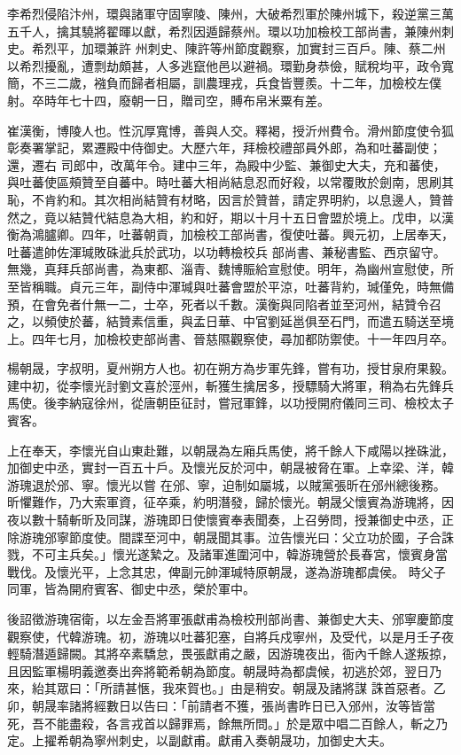 \begin{pinyinscope}
 李希烈侵陷汴州，環與諸軍守固寧陵、陳州，大破希烈軍於陳州城下，殺逆黨三萬五千人，擒其驍將翟暉以獻，希烈因遁歸蔡州。環以功加檢校工部尚書，兼陳州刺史。希烈平，加環兼許
 州刺史、陳許等州節度觀察，加實封三百戶。陳、蔡二州以希烈擾亂，遭剽劫頗甚，人多逃竄他邑以避禍。環勤身恭儉，賦稅均平，政令寬簡，不三二歲，襁負而歸者相屬，訓農理戎，兵食皆豐羨。十二年，加檢校左僕射。卒時年七十四，廢朝一日，贈司空，賻布帛米粟有差。



 崔漢衡，博陵人也。性沉厚寬博，善與人交。釋褐，授沂州費令。滑州節度使令狐彰奏署掌記，累遷殿中侍御史。大歷六年，拜檢校禮部員外郎，為和吐蕃副使；還，遷右
 司郎中，改萬年令。建中三年，為殿中少監、兼御史大夫，充和蕃使，與吐蕃使區頰贊至自蕃中。時吐蕃大相尚結息忍而好殺，以常覆敗於劍南，思刷其恥，不肯約和。其次相尚結贊有材略，因言於贊普，請定界明約，以息邊人，贊普然之，竟以結贊代結息為大相，約和好，期以十月十五日會盟於境上。戊申，以漢衡為鴻臚卿。四年，吐蕃朝貢，加檢校工部尚書，復使吐蕃。興元初，上居奉天，吐蕃遣帥佐渾瑊敗硃泚兵於武功，以功轉檢校兵
 部尚書、兼秘書監、西京留守。無幾，真拜兵部尚書，為東都、淄青、魏博賑給宣慰使。明年，為幽州宣慰使，所至皆稱職。貞元三年，副侍中渾瑊與吐蕃會盟於平涼，吐蕃背約，瑊僅免，時無備預，在會免者什無一二，士卒，死者以千數。漢衡與同陷者並至河州，結贊令召之，以頻使於蕃，結贊素信重，與孟日華、中官劉延邕俱至石門，而遣五騎送至境上。四年七月，加檢校吏部尚書、晉慈隰觀察使，尋加都防禦使。十一年四月卒。



 楊朝晟，字叔明，夏州朔方人也。初在朔方為步軍先鋒，嘗有功，授甘泉府果毅。建中初，從李懷光討劉文喜於涇州，斬獲生擒居多，授驃騎大將軍，稍為右先鋒兵馬使。後李納寇徐州，從唐朝臣征討，嘗冠軍鋒，以功授開府儀同三司、檢校太子賓客。



 上在奉天，李懷光自山東赴難，以朝晟為左廂兵馬使，將千餘人下咸陽以挫硃泚，加御史中丞，實封一百五十戶。及懷光反於河中，朝晟被脅在軍。上幸梁、洋，韓游瑰退於邠、寧。懷光以嘗
 在邠、寧，迫制如屬城，以賊黨張昕在邠州總後務。昕懼難作，乃大索軍資，征卒乘，約明潛發，歸於懷光。朝晟父懷賓為游瑰將，因夜以數十騎斬昕及同謀，游瑰即日使懷賓奉表聞奏，上召勞問，授兼御史中丞，正除游瑰邠寧節度使。間諜至河中，朝晟聞其事。泣告懷光曰：父立功於國，子合誅戮，不可主兵矣。」懷光遂縶之。及諸軍進圍河中，韓游瑰營於長春宮，懷賓身當戰伐。及懷光平，上念其忠，俾副元帥渾瑊特原朝晟，遂為游瑰都虞侯。
 時父子同軍，皆為開府賓客、御史中丞，榮於軍中。



 後詔徵游瑰宿衛，以左金吾將軍張獻甫為檢校刑部尚書、兼御史大夫、邠寧慶節度觀察使，代韓游瑰。初，游瑰以吐蕃犯塞，自將兵戍寧州，及受代，以是月壬子夜輕騎潛遁歸闕。其將卒素驕怠，畏張獻甫之嚴，因游瑰夜出，衙內千餘人遂叛掠，且因監軍楊明義邀奏出奔將範希朝為節度。朝晟時為都虞候，初逃於郊，翌日乃來，紿其眾曰：「所請甚愜，我來賀也。」由是稍安。朝晟及諸將謀
 誅首惡者。乙卯，朝晟率諸將經數日以告曰：「前請者不獲，張尚書昨日已入邠州，汝等皆當死，吾不能盡殺，各言戎首以歸罪焉，餘無所問。」於是眾中唱二百餘人，斬之乃定。上擢希朝為寧州刺史，以副獻甫。獻甫入奏朝晟功，加御史大夫。




\end{pinyinscope}
